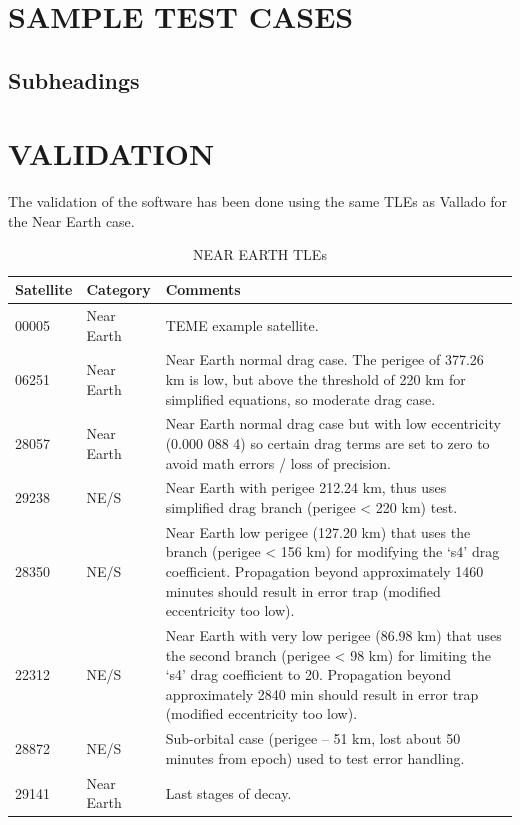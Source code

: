 \documentclass{article}
\begin{document}

\section{SAMPLE TEST CASES}
\label{sec:sampletestcases}


\subsection{Subheadings}
\label{ssec:subhead}



\section{VALIDATION}
\label{sec:validation}

The validation of the software has been done using the same TLEs as Vallado for the Near Earth case.

\begin{table}[htb]
\centering
\caption{NEAR EARTH TLEs}\vspace{2mm}
\begin{tabular}{lll}
\hline\hline
Satellite & Category & Comments\\
\hline
00005 & Near Earth & TEME example satellite.\\
06251 &  Near Earth  & Near Earth normal drag case. The perigee of 377.26 km is low, but above the threshold of 220
km for simplified equations, so moderate drag case.\\
28057 &  Near Earth  & Near Earth normal drag case but with low eccentricity (0.000 088 4) so certain drag terms are
set to zero to avoid math errors / loss of precision.\\
29238  & NE/S  & Near Earth with perigee 212.24 km, thus uses simplified drag branch (perigee < 220 km) test.\\
28350 & NE/S  & Near Earth low perigee (127.20 km) that uses the branch (perigee < 156 km) for modifying
the ‘s4’ drag coefficient. Propagation beyond approximately 1460 minutes should result in
error trap (modified eccentricity too low).\\
22312  & NE/S  & Near Earth with very low perigee (86.98 km) that uses the second branch (perigee < 98 km)
for limiting the ‘s4’ drag coefficient to 20. Propagation beyond approximately 2840 min
should result in error trap (modified eccentricity too low).\\
28872  & NE/S  & Sub-orbital case (perigee – 51 km, lost about 50 minutes from epoch) used to test error handling.\\
29141  & Near Earth  & Last stages of decay.\\
\hline\hline
\end{tabular}
\label{tab:res}
\end{table}
\end{document}
